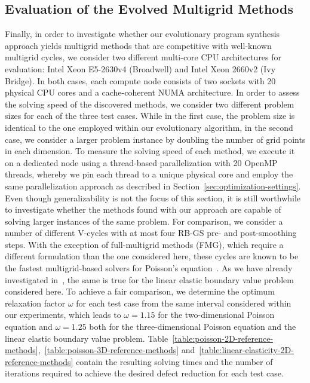 \subsection{Evaluation of the Evolved Multigrid Methods}
Finally, in order to investigate whether our evolutionary program synthesis approach yields multigrid methods that are competitive with well-known multigrid cycles, we consider two different multi-core CPU architectures for evaluation: Intel Xeon E5-2630v4 (Broadwell) and Intel Xeon 2660v2 (Ivy Bridge).
In both cases, each compute node consists of two sockets with 20 physical CPU cores and a cache-coherent NUMA architecture.
In order to assess the solving speed of the discovered methods, we consider two different problem sizes for each of the three test cases.
While in the first case, the problem size is identical to the one employed within our evolutionary algorithm, in the second case, we consider a larger problem instance by doubling the number of grid points in each dimension.
To measure the solving speed of each method, we execute it on a dedicated node using a thread-based parallelization with 20 OpenMP threads, whereby we pin each thread to a unique physical core and employ the same parallelization approach as described in Section~\ref{sec:optimization-settings}.
Even though generalizability is not the focus of this section, it is still worthwhile to investigate whether the methods found with our approach are capable of solving larger instances of the same problem.
For comparison, we consider a number of different V-cycles with at most four RB-GS pre- and post-smoothing steps.
With the exception of full-multigrid methods (FMG), which require a different formulation than the one considered here, these cycles are known to be the fastest multigrid-based solvers for Poisson's equation~\cite{trottenberg2000multigrid}.
As we have already investigated in~\cite{schmitt2020constructing}, the same is true for the linear elastic boundary value problem considered here.
To achieve a fair comparison, we determine the optimum relaxation factor $\omega$ for each test case from the same interval considered within our experiments, which leads to $\omega = 1.15$ for the two-dimensional Poisson equation and $\omega = 1.25$ both for the three-dimensional Poisson equation and the linear elastic boundary value problem.
Table~\ref{table:poisson-2D-reference-methods},~\ref{table:poisson-3D-reference-methods} and~\ref{table:linear-elasticity-2D-reference-methods} contain the resulting solving times and the number of iterations required to achieve the desired defect reduction for each test case.
